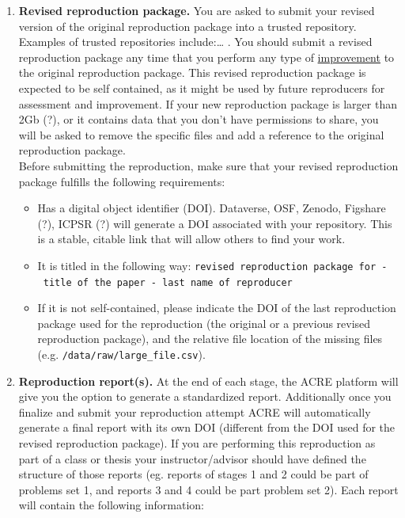 \documentclass[]{book}
\providecommand{\tightlist}{%
  \setlength{\itemsep}{0pt}\setlength{\parskip}{0pt}}
\begin{document}
\begin{enumerate}
\def\labelenumi{\arabic{enumi}.}
\tightlist
\item
  \textbf{Revised reproduction package.} You are asked to submit your revised version of the original reproduction package into a trusted repository. Examples of trusted repositories include:\ldots{} . You should submit a revised reproduction package any time that you perform any type of \protect\hyperlink{improvements}{improvement} to the original reproduction package. This revised reproduction package is expected to be self contained, as it might be used by future reproducers for assessment and improvement. If your new reproduction package is larger than 2Gb (?), or it contains data that you don't have permissions to share, you will be asked to remove the specific files and add a reference to the original reproduction package.\\
  Before submitting the reproduction, make sure that your revised reproduction package fulfills the following requirements:

  \begin{itemize}
  \tightlist
  \item
    Has a digital object identifier (DOI). Dataverse, OSF, Zenodo, Figshare (?), ICPSR (?) will generate a DOI associated with your repository. This is a stable, citable link that will allow others to find your work.\\
  \item
    It is titled in the following way: \texttt{revised\ reproduction\ package\ for\ -\ title\ of\ the\ paper\ -\ last\ name\ of\ reproducer}
  \item
    If it is not self-contained, please indicate the DOI of the last reproduction package used for the reproduction (the original or a previous revised reproduction package), and the relative file location of the missing files (e.g. \texttt{/data/raw/large\_file.csv}).
  \end{itemize}
\item
  \textbf{Reproduction report(s).} At the end of each stage, the ACRE platform will give you the option to generate a standardized report. Additionally once you finalize and submit your reproduction attempt ACRE will automatically generate a final report with its own DOI (different from the DOI used for the revised reproduction package). If you are performing this reproduction as part of a class or thesis your instructor/advisor should have defined the structure of those reports (eg. reports of stages 1 and 2 could be part of problems set 1, and reports 3 and 4 could be part problem set 2). Each report will contain the following information:


\end{enumerate}
\end{document}
